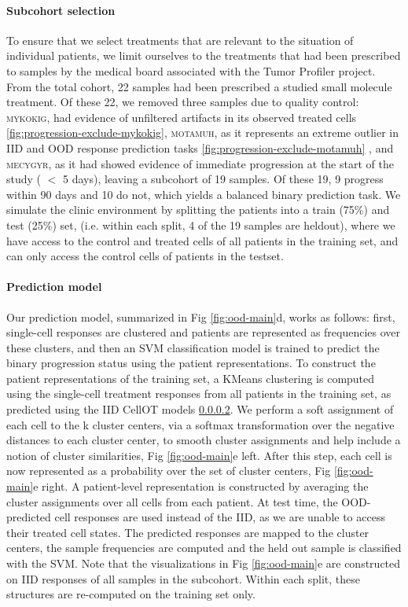 \paragraph{Subcohort selection}
To ensure that we select treatments that are relevant to the situation of individual patients, we limit ourselves to the treatments that had been prescribed to samples by the medical board associated with the Tumor Profiler project.
From the total cohort, 22 samples had been prescribed a studied small molecule treatment.
Of these 22, we removed three samples due to quality control: \textsc{mykokig}, had evidence of unfiltered artifacts in its observed treated cells \ref{fig:progression-exclude-mykokig}, \textsc{motamuh}, as it represents an extreme outlier in IID and OOD response prediction tasks \ref{fig:progression-exclude-motamuh} , and \textsc{mecygyr}, as it had showed evidence of immediate progression at the start of the study ( $<$ 5 days), leaving a subcohort of 19 samples.
Of these 19, 9 progress within 90 days and 10 do not, which yields a balanced binary prediction task.
We simulate the clinic environment by splitting the patients into a train (75\%) and test (25\%) set, (i.e. within each split, 4 of the 19 samples are heldout), where we have access to the control and treated cells of all patients in the training set, and can only access the control cells of patients in the testset.

\paragraph{Prediction model}
Our prediction model, summarized in Fig \ref{fig:ood-main}d, works as follows: first, single-cell responses are clustered and patients are represented as frequencies over these clusters, and then an SVM classification model is trained to predict the binary progression status using the patient representations.
To construct the patient representations of the training set, a KMeans clustering is computed using the single-cell treatment responses from all patients in the training set, as predicted using the IID CellOT models \ref{}.
We perform a soft assignment of each cell to the k cluster centers, via a softmax transformation over the negative distances to each cluster center, to smooth cluster assignments and help include a notion of cluster similarities, Fig \ref{fig:ood-main}e left.
After this step, each cell is now represented as a probability over the set of cluster centers, Fig \ref{fig:ood-main}e right.
A patient-level representation is constructed by averaging the cluster assignments over all cells from each patient.
At test time, the OOD-predicted cell responses are used instead of the IID, as we are unable to access their treated cell states.
The predicted responses are mapped to the cluster centers, the sample frequencies are computed and the held out sample is classified with the SVM.
Note that the visualizations in Fig \ref{fig:ood-main}e are constructed on IID responses of all samples in the subcohort.
Within each split, these structures are re-computed on the training set only.

